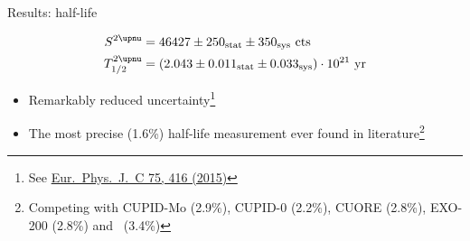 \documentclass[10pt,aspectratio=169]{beamer}
\begin{document}
\begin{frame}{Results: \texorpdfstring{\nnbb}{2νββ} half-life}
  \begin{simpleblock}%
    \setlength{\abovedisplayskip}{0pt}
    \setlength{\abovedisplayshortskip}{0pt}
    \begin{align*}%
      S^{2\upnu} &= 46427 \pm \stat{250} \pm \syst{350}~\text{cts}\\
      \thalftwoM &= (2.043 \pm \stat{0.011} \pm \syst{0.033}) \cdot 10^{21}~\text{yr}
    \end{align*}
  \end{simpleblock}
  \begin{itemize}
    \item Remarkably reduced uncertainty\footnote{See \href{https://doi.org/10.1140/epjc/s10052-015-3627-y}{Eur.~Phys.~J.~C 75, 416 (2015)}}
    \item The most precise (1.6\%) half-life measurement ever found in
      literature\footnote{Competing with CUPID-Mo (2.9\%), CUPID-0 (2.2\%),
      CUORE (2.8\%), EXO-200 (2.8\%) and \kamlandzen\ (3.4\%)}
  \end{itemize}
\end{frame}
\end{document}
